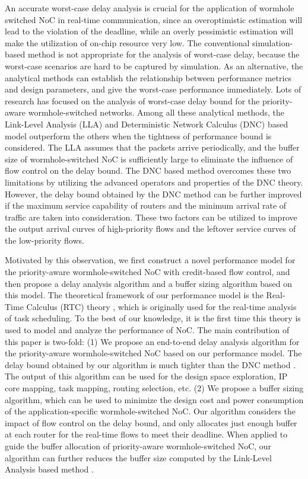 \documentclass[preprint]{elsarticle}
\begin{document}
An accurate worst-case delay analysis is crucial for the application of wormhole switched NoC in real-time communication, since an overoptimistic estimation will lead to the violation of the deadline, while an overly pessimistic estimation will make the utilization of on-chip resource very low. The conventional simulation-based method is not appropriate for the analysis of worst-case delay, because the worst-case scenarios are hard to be captured by simulation. As an alternative, the analytical methods can establish the relationship between performance metrics and design parameters, and give the worst-case performance immediately. Lots of research \cite{Shi:2008:RCA:1397757.1397996,73,Qian489900,LuJS05,707545,708526} has focused on the analysis of worst-case delay bound for the priority-aware wormhole-switched networks. Among all these analytical methods, the Link-Level Analysis (LLA) \cite{73}\cite{189} and Deterministic Network Calculus (DNC) \cite{Qian489900} based model outperform the others when the tightness of performance bound is considered. The LLA assumes that the packets arrive periodically, and the buffer size of wormhole-switched NoC is sufficiently large to eliminate the influence of flow control on the delay bound. The DNC based method \cite{Qian489900} overcomes these two limitations by utilizing the advanced operators and properties of the DNC theory. However, the delay bound obtained by the DNC method \cite{Qian489900} can be further improved if the maximum service capability of routers and the minimum arrival rate of traffic are taken into consideration. These two factors can be utilized to improve the output arrival curves of high-priority flows and the leftover service curves of the low-priority flows.

Motivated by this observation, we first construct a novel performance model for the priority-aware wormhole-switched NoC with credit-based flow control, and then propose a delay analysis algorithm and a buffer sizing algorithm based on this model. The theoretical framework of our performance model is the Real-Time Calculus (RTC) theory \cite{1253607}, which is originally used for the real-time analysis of task scheduling. To the best of our knowledge, it is the first time this theory is used to model and analyze the performance of NoC. The main contribution of this paper is two-fold: (1) We propose an end-to-end delay analysis algorithm for the priority-aware wormhole-switched NoC based on our performance model. The delay bound obtained by our algorithm is much tighter than the DNC method \cite{Qian489900}. The output of this algorithm can be used for the design space exploration, IP core mapping, task mapping, routing selection, etc. (2) We propose a buffer sizing algorithm, which can be used to minimize the design cost and power consumption of the application-specific wormhole-switched NoC. Our algorithm considers the impact of flow control on the delay bound, and only allocates just enough buffer at each router for the real-time flows to meet their deadline. When applied to guide the buffer allocation of priority-aware wormhole-switched NoC, our algorithm can further reduces the buffer size computed by the Link-Level Analysis based method \cite{189}.
\end{document}
